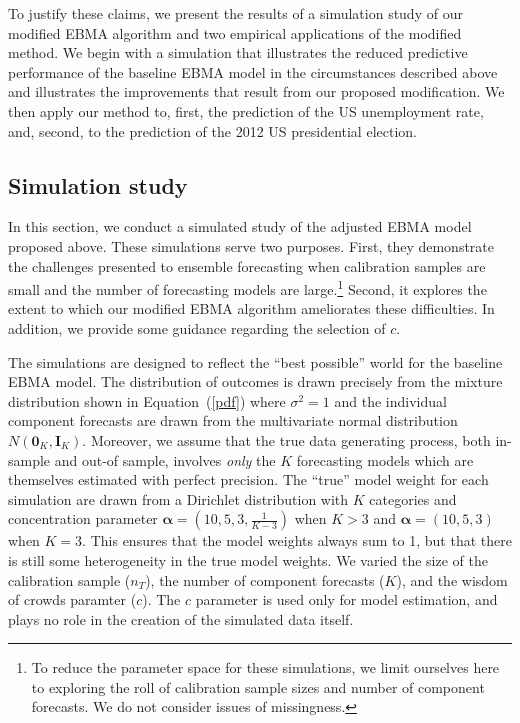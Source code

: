 \documentclass[12pt,fullpage,endnotes]{article}
\begin{document}
To justify these claims, we present the results of a
simulation study of our modified EBMA algorithm and two empirical
applications of the modified method. We begin with a simulation that
illustrates the reduced predictive performance of the baseline EBMA
model in the circumstances described above and illustrates the
improvements that result from our proposed modification.  We then
apply our method to, first, the prediction of the US unemployment
rate, and, second, to the prediction of the 2012 US presidential
election.

\subsection{Simulation study} 

In this section, we conduct a simulated study of the adjusted EBMA
model proposed above.  These simulations serve two purposes.  First,
they demonstrate the challenges presented to ensemble forecasting when
calibration samples are small and the number of forecasting models are
large.\footnote{To reduce the parameter space for these simulations,
  we limit ourselves here to exploring the roll of calibration sample
  sizes and number of component forecasts.  We do not consider issues
  of missingness.}  Second, it explores the extent to which our
modified EBMA algorithm ameliorates these difficulties.  In addition,
we provide some guidance regarding the selection of $c$.

The simulations are designed to reflect the ``best possible'' world
for the baseline EBMA model.  The distribution of outcomes is drawn
precisely from the mixture distribution shown in Equation~(\ref{pdf})
where $\sigma^2 = 1$ and the individual component forecasts are drawn
from the multivariate normal distribution $N(\mathbf{0}_K,
\mathbf{I}_K)$.  Moreover, we assume that the true data generating
process, both in-sample and out-of sample, involves \textit{only} the
$K$ forecasting models which are themselves estimated with perfect
precision. The ``true'' model weight for each simulation are drawn
from a Dirichlet distribution with $K$ categories and concentration
parameter $\mathbf{\alpha} = (10, 5, 3, \frac{1}{K-3})$ when $K>3$ and
$\mathbf{\alpha} = (10, 5, 3)$ when $K=3$. This ensures that the
model weights always sum to 1, but that there is still some
heterogeneity in the true model weights.  We varied the size of the
calibration sample ($n_T$), the number of component forecasts ($K$),
and the wisdom of crowds paramter ($c$). The $c$ parameter is used only for
model estimation, and plays no role in the creation of the simulated
data itself.
\end{document}
